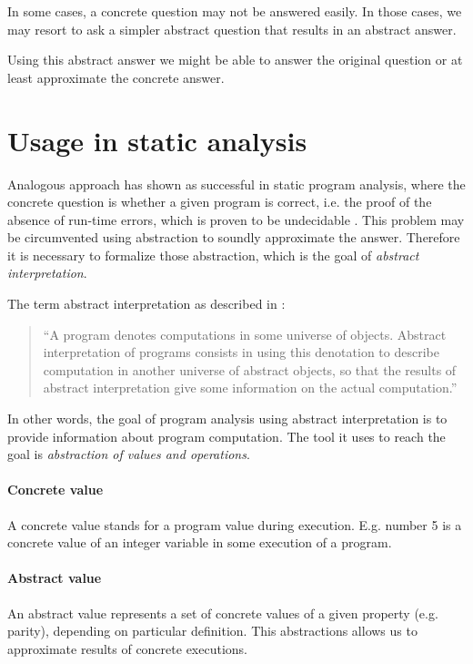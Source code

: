 \documentclass[12pt,oneside]{fithesis2}
\theoremstyle{definition}
\begin{document}
In some cases, a concrete question may not be answered easily. In those cases, we may resort to ask a simpler abstract question that results in an abstract answer.

Using this abstract answer we might be able to answer the original question or at least approximate the concrete answer. \cite{CousotCousot04-WCC}

\section{Usage in static analysis}

Analogous approach has shown as successful in static program analysis, where the concrete question is whether a given program is correct, i.e. the proof of the absence of run-time errors, which is proven to be undecidable \cite{mine-AIAA10}. This problem may be circumvented using abstraction to soundly approximate the answer. Therefore it is necessary to formalize those abstraction, which is the goal of \textit{abstract interpretation}.

The term abstract interpretation as described in \cite{CousotCousot77-1}:

\begin{quotation}
``A program denotes computations in some universe of objects. Abstract interpretation of programs consists in using this denotation to describe computation in another universe of abstract objects, so that the results of abstract interpretation give some information on the actual computation.''
\end{quotation}

In other words, the goal of program analysis using abstract interpretation is to provide information about program computation. The tool it uses to reach the goal is \textit{abstraction of values and operations}.

\paragraph{Concrete value}
A concrete value stands for a program value during execution. E.g. number 5 is a concrete value of an integer variable in some execution of a program.

\paragraph{Abstract value}
An abstract value represents a set of concrete values of a given property (e.g. parity), depending on particular definition. This abstractions allows us to approximate results of concrete executions.
\end{document}
